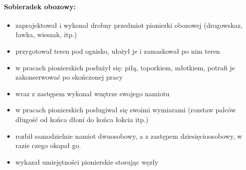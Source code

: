 \paragraph{Sobieradek obozowy:}	\begin{itemize}[noitemsep,nolistsep] 
\item  zaprojektował i wykonał drobny przedmiot pionierki obozowej (drogowskaz,  ławka,  wieszak, itp.)
\item  przygotował teren pod ognisko, ułożył  je i zamaskował po nim teren
\item  w pracach pionierskich  posłużył  się: piłą, toporkiem, młotkiem, potrafi je zakonserwować po skończonej pracy
\item  wraz z zastępem wykonał wnętrze swojego namiotu
\item  w pracach pionierskich posługiwał się swoimi wymiarami (rozstaw palców długość od końca dłoni do końca łokcia itp.)
\item  rozbił samodzielnie namiot  dwuosobowy, a z zastępem dziesięcioosobowy, w razie czego okopał go.
\item  wykazał umiejętności pionierskie stosując węzły
\end{itemize}